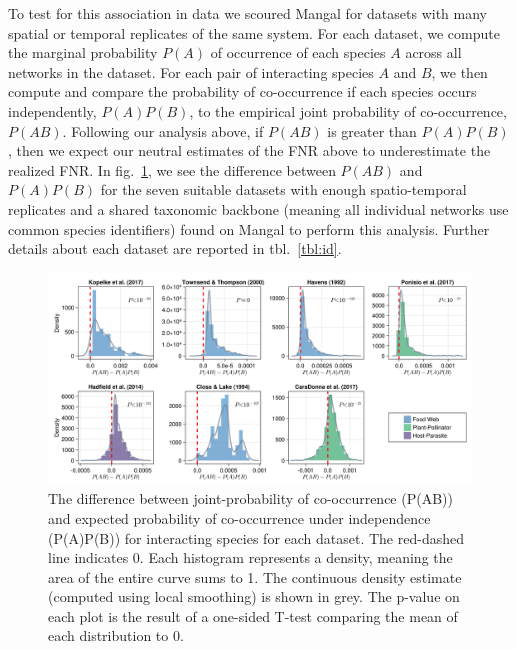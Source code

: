 \documentclass[11pt]{article}
\makeatletter
\def\maxwidth{\ifdim\Gin@nat@width>\linewidth\linewidth
\else\Gin@nat@width\fi}
\let\Oldincludegraphics\includegraphics
\renewcommand{\includegraphics}[1]{\Oldincludegraphics[width=\maxwidth]{#1}}
\makeatother
\begin{document}
To test for this association in data we scoured Mangal for datasets with
many spatial or temporal replicates of the same system. For each
dataset, we compute the marginal probability \(P(A)\) of occurrence of
each species \(A\) across all networks in the dataset. For each pair of
interacting species \(A\) and \(B\), we then compute and compare the
probability of co-occurrence if each species occurs independently,
\(P(A)P(B)\), to the empirical joint probability of co-occurrence,
\(P(AB)\). Following our analysis above, if \(P(AB)\) is greater than
\(P(A)P(B)\), then we expect our neutral estimates of the FNR above to
underestimate the realized FNR. In fig.~\ref{fig:mangal}, we see the
difference between \(P(AB)\) and \(P(A)P(B)\) for the seven suitable
datasets with enough spatio-temporal replicates and a shared taxonomic
backbone (meaning all individual networks use common species
identifiers) found on Mangal to perform this analysis. Further details
about each dataset are reported in tbl.~\ref{tbl:id}.

\begin{figure}
\hypertarget{fig:mangal}{%
\centering
\includegraphics{./figures/fig2.png}
\caption{The difference between joint-probability of co-occurrence
(P(AB)) and expected probability of co-occurrence under independence
(P(A)P(B)) for interacting species for each dataset. The red-dashed line
indicates 0. Each histogram represents a density, meaning the area of
the entire curve sums to 1. The continuous density estimate (computed
using local smoothing) is shown in grey. The p-value on each plot is the
result of a one-sided T-test comparing the mean of each distribution to
0.}\label{fig:mangal}
}
\end{figure}
\end{document}
